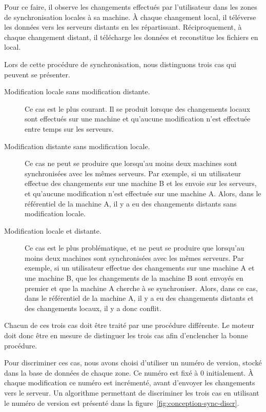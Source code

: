 Pour ce faire, il observe les changements effectués par l'utilisateur dans les zones de synchronisation locales à sa machine. À chaque changement local, il téléverse les données vers les serveurs distants en les répartissant. Réciproquement, à chaque changement distant, il télécharge les données et reconstitue les fichiers en local.

Lors de cette procédure de synchronisation, nous distinguons trois cas qui peuvent se présenter.

\begin{description}
    \item[Modification locale sans modification distante.] Ce cas est le plus courant. Il se produit lorsque des changements locaux sont effectués sur une machine et qu'aucune modification n'est effectuée entre temps sur les serveurs.

    \item[Modification distante sans modification locale.] Ce cas ne peut se produire que lorsqu'au moins deux machines sont synchronisées avec les mêmes serveurs. Par exemple, si un utilisateur effectue des changements sur une machine B et les envoie sur les serveurs, et qu'aucune modification n'est effectuée sur une machine A. Alors, dans le référentiel de la machine A, il y a eu des changements distants sans modification locale.

    \item[Modification locale et distante.] Ce cas est le plus problématique, et ne peut se produire que lorsqu'au moins deux machines sont synchronisées avec les mêmes serveurs. Par exemple, si un utilisateur effectue des changements sur une machine A et une machine B, que les changements de la machine B sont envoyés en premier et que la machine A cherche à se synchroniser. Alors, dans ce cas, dans le référentiel de la machine A, il y a eu des changements distants et des changements locaux, il y a donc conflit.
\end{description}

Chacun de ces trois cas doit être traité par une procédure différente. Le moteur doit donc être en mesure de distinguer les trois cas afin d'enclencher la bonne procédure.

Pour discriminer ces cas, nous avons choisi d'utiliser un numéro de version, stocké dans la base de données de chaque zone. Ce numéro est fixé à 0 initialement. À chaque modification ce numéro est incrémenté, avant d'envoyer les changements vers le serveur. Un algorithme permettant de discriminer les trois cas en utilisant le numéro de version est présenté dans la figure~\ref{fig:conception-sync-discr}.

